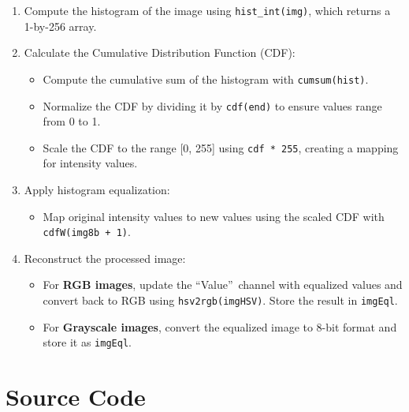 \documentclass[a4paper,11pt]{article}
\begin{document}
    \begin{enumerate}
        \item Compute the histogram of the image using \texttt{hist\_int(img)}, which returns a 1-by-256 array.
        \item Calculate the Cumulative Distribution Function (CDF):
        \begin{itemize}
            \item Compute the cumulative sum of the histogram with \texttt{cumsum(hist)}.
            \item Normalize the CDF by dividing it by \texttt{cdf(end)} to ensure values range from 0 to 1.
            \item Scale the CDF to the range [0, 255] using \texttt{cdf * 255}, creating a mapping for intensity values.
        \end{itemize}
        \item Apply histogram equalization:
        \begin{itemize}
            \item Map original intensity values to new values using the scaled CDF with \texttt{cdfW(img8b + 1)}.
        \end{itemize}
        \item Reconstruct the processed image:
        \begin{itemize}
            \item For \textbf{RGB images}, update the \textquotedblleft Value\textquotedblright\ channel with equalized values and convert back to RGB using \texttt{hsv2rgb(imgHSV)}. Store the result in \texttt{imgEql}.
            \item For \textbf{Grayscale images}, convert the equalized image to 8-bit format and store it as \texttt{imgEql}.
        \end{itemize}
    \end{enumerate}


\section{Source Code}
\end{document}
